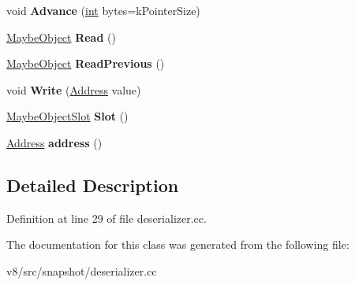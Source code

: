 \begin{DoxyCompactItemize}
$$\item 
\mbox{\label{classv8_1_1internal_1_1UnalignedSlot_a697144c72f39998fa8c5314aa3416aa7}} 
void {\bfseries Advance} (\mbox{\hyperlink{classint}{int}} bytes=k\+Pointer\+Size)
\item 
\mbox{\label{classv8_1_1internal_1_1UnalignedSlot_a476fb318de178fbb861197f52d819bb2}} 
\mbox{\hyperlink{classv8_1_1internal_1_1MaybeObject}{Maybe\+Object}} {\bfseries Read} ()
\item 
\mbox{\label{classv8_1_1internal_1_1UnalignedSlot_aa687bb21937c2925b082216bd4d38985}} 
\mbox{\hyperlink{classv8_1_1internal_1_1MaybeObject}{Maybe\+Object}} {\bfseries Read\+Previous} ()
\item 
\mbox{\label{classv8_1_1internal_1_1UnalignedSlot_a5c084bf2dde2097625bddc653dd22b2a}} 
void {\bfseries Write} (\mbox{\hyperlink{classuintptr__t}{Address}} value)
\item 
\mbox{\label{classv8_1_1internal_1_1UnalignedSlot_a6321279761ff5aedda3aaf56a8fe25ce}} 
\mbox{\hyperlink{classv8_1_1internal_1_1MaybeObjectSlot}{Maybe\+Object\+Slot}} {\bfseries Slot} ()
\item 
\mbox{\label{classv8_1_1internal_1_1UnalignedSlot_ac1ffb40d1ac72cadd762e52bff20a857}} 
\mbox{\hyperlink{classuintptr__t}{Address}} {\bfseries address} ()
\end{DoxyCompactItemize}


\subsection{Detailed Description}


Definition at line 29 of file deserializer.\+cc.



The documentation for this class was generated from the following file\+:\begin{DoxyCompactItemize}
\item 
v8/src/snapshot/deserializer.\+cc\end{DoxyCompactItemize}
